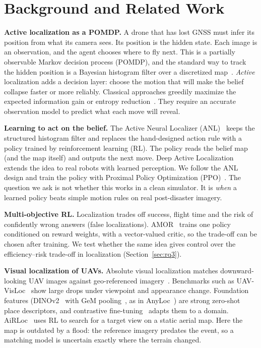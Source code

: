 \section{Background and Related Work}
\label{sec:background}

\textbf{Active localization as a POMDP.}
A drone that has lost GNSS must infer its position from what its camera sees. Its position is the hidden state. Each image is an observation, and the agent chooses where to fly next. This is a partially observable Markov decision process (POMDP), and the standard way to track the hidden position is a Bayesian histogram filter over a discretized map~\cite{thrun2005probabilistic}. \emph{Active} localization adds a decision layer: choose the motion that will make the belief collapse faster or more reliably. Classical approaches greedily maximize the expected information gain or entropy reduction~\cite{burgard1997active}. They require an accurate observation model to predict what each move will reveal.

\textbf{Learning to act on the belief.}
The Active Neural Localizer (ANL)~\cite{chaplot2018anl} keeps the structured histogram filter and replaces the hand-designed action rule with a policy trained by reinforcement learning (RL). The policy reads the belief map (and the map itself) and outputs the next move. Deep Active Localization~\cite{gottipati2019dal} extends the idea to real robots with learned perception. We follow the ANL design and train the policy with Proximal Policy Optimization (PPO)~\cite{schulman2017ppo}. The question we ask is not whether this works in a clean simulator. It is \emph{when} a learned policy beats simple motion rules on real post-disaster imagery.

\textbf{Multi-objective RL.}
Localization trades off success, flight time and the risk of confidently wrong answers (false localizations). AMOR~\cite{alegre2025amor} trains one policy conditioned on reward weights, with a vector-valued critic, so the trade-off can be chosen after training. We test whether the same idea gives control over the efficiency--risk trade-off in localization (Section~\ref{sec:rq3}).

\textbf{Visual localization of UAVs.}
Absolute visual localization matches downward-looking UAV images against geo-referenced imagery~\cite{couturier2021review,couturier2024review}. Benchmarks such as UAV-VisLoc~\cite{xu2024uavvisloc} show large drops under viewpoint and appearance change. Foundation features (DINOv2~\cite{oquab2023dinov2} with GeM pooling~\cite{radenovic2019gem}, as in AnyLoc~\cite{keetha2023anyloc}) are strong zero-shot place descriptors, and contrastive fine-tuning~\cite{oord2018cpc} adapts them to a domain. AiRLoc~\cite{pirinen2022airloc} uses RL to search for a target view on a static aerial map. Here the map is outdated by a flood: the reference imagery predates the event, so a matching model is uncertain exactly where the terrain changed.

